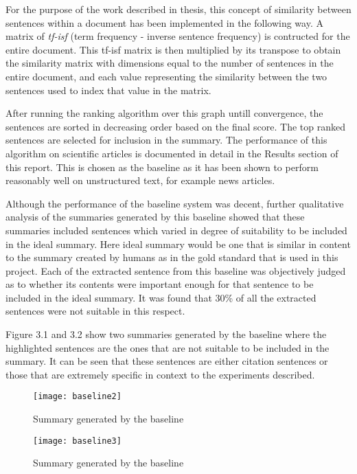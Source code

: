 For the purpose of the work described in thesis, this concept of similarity between sentences within a document has been implemented in the following way.
A matrix of \emph{tf-isf} (term frequency - inverse sentence frequency) is contructed for the entire document.
This tf-isf matrix is then multiplied by its transpose to obtain the similarity matrix with dimensions equal to the number of sentences in the entire document, and each value representing the similarity between the two sentences used to index that value in the matrix.

After running the ranking algorithm over this graph untill convergence, the sentences are sorted in decreasing order based on the final score.
The top ranked sentences are selected for inclusion in the summary.
The performance of this algorithm on scientific articles is documented in detail in the Results section of this report.
This is chosen as the baseline as it has been shown to perform reasonably well on unstructured text, for example news articles.

Although the performance of the baseline system was decent, further qualitative analysis of the summaries generated by this baseline showed that these summaries included sentences which varied in degree of suitability to be included in the ideal summary.
Here ideal summary would be one that is similar in content to the summary created by humans as in the gold standard that is used in this project.
Each of the extracted sentence from this baseline was objectively judged as to whether its contents were important enough for that sentence to be included in the ideal summary.
It was found that 30\% of all the extracted sentences were not suitable in this respect.

Figure 3.1 and 3.2 show two summaries generated by the baseline where the highlighted sentences are the ones that are not suitable to be included in the summary.
It can be seen that these sentences are either citation sentences or those that are extremely specific in context to the experiments described.

\begin{figure}[h]
\texttt{[image: baseline2]} 
\label{fig:base1}
\caption{Summary generated by the baseline}
\end{figure}
\begin{figure}[h]
\texttt{[image: baseline3]}
\label{fig:base2}
\caption{Summary generated by the baseline}
\label{fig:baseline}
\end{figure}


